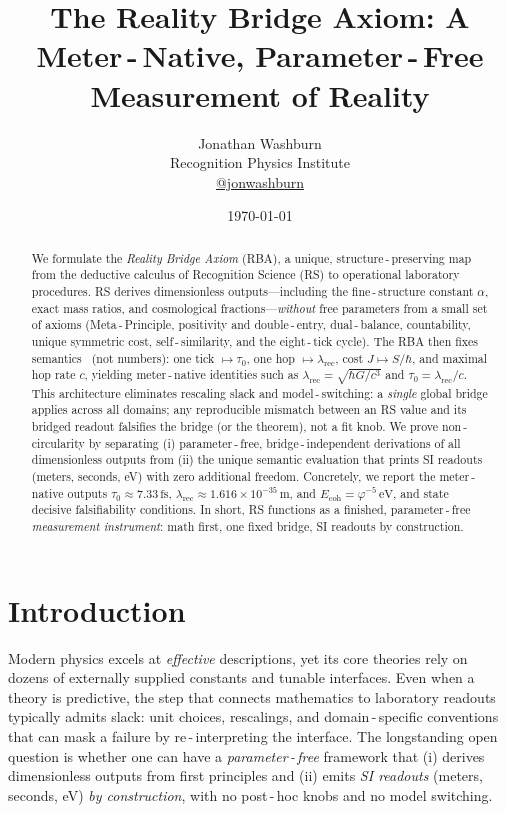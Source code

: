 \documentclass[11pt]{article}
\title{\textbf{The Reality Bridge Axiom: A Meter\,\mbox{-}\,Native, Parameter\,\mbox{-}\,Free Measurement of Reality}}
\author{Jonathan Washburn \\
\small Recognition Physics Institute \\
\small \href{https://twitter.com/jonwashburn}{@jonwashburn}}
\date{\today}
\newcommand{\ph}{\varphi}
\newcommand{\lamrec}{\lambda_{\mathrm{rec}}}
\newcommand{\tauzero}{\tau_{0}}
\newcommand{\Ecoh}{E_{\mathrm{coh}}}
\theoremstyle{remark}
\begin{document}
\maketitle

\begin{abstract}
\noindent
We formulate the \emph{Reality Bridge Axiom} (RBA), a unique, structure\,\mbox{-}\,preserving map from the deductive calculus of Recognition Science (RS) to
operational laboratory procedures. RS derives dimensionless outputs---including the fine\,\mbox{-}\,structure constant $\alpha$, exact mass ratios, and cosmological fractions---\emph{without} free parameters from a small set of axioms (Meta\,\mbox{-}\,Principle, positivity and double\,\mbox{-}\,entry, dual\,\mbox{-}\,balance, countability, unique symmetric cost, self\,\mbox{-}\,similarity, and the eight\,\mbox{-}\,tick cycle). The RBA then fixes semantics \
(not numbers): one tick $\mapsto \tauzero$, one hop $\mapsto \lamrec$, cost $J \mapsto S/\hbar$, and maximal hop rate $c$, yielding meter\,\mbox{-}\,native identities such as $\lamrec = \sqrt{\hbar G/c^{3}}$ and $\tauzero = \lamrec/c$. This architecture eliminates rescaling slack and model\,\mbox{-}\,switching: a \emph{single} global bridge applies across all domains; any reproducible mismatch between an RS value and its bridged readout falsifies the bridge (or the theorem), not a fit knob. We prove non\,\mbox{-}\,circularity by separating (i) parameter\,\mbox{-}\,free, bridge\,\mbox{-}\,independent derivations of all dimensionless outputs from (ii) the unique semantic evaluation that prints SI readouts (meters, seconds, eV) with zero additional freedom. Concretely, we report the meter\,\mbox{-}\,native outputs $\tauzero \approx 7.33\,\mathrm{fs}$, $\lamrec \approx 1.616\times 10^{-35}\,\mathrm{m}$, and $\Ecoh = \ph^{-5}\,\mathrm{eV}$, and state decisive falsifiability conditions. In short, RS functions as a finished, parameter\,\mbox{-}\,free \emph{measurement instrument}: math first, one fixed bridge, SI readouts by construction.
\end{abstract}

\section{Introduction}
Modern physics excels at \emph{effective} descriptions, yet its core theories rely on
dozens of externally supplied constants and tunable interfaces. Even when a theory
is predictive, the step that connects mathematics to laboratory readouts typically
admits slack: unit choices, rescalings, and domain\,\mbox{-}\,specific conventions that can
mask a failure by re\,\mbox{-}\,interpreting the interface. The longstanding open question is
whether one can have a \emph{parameter\,\mbox{-}\,free} framework that (i) derives dimensionless
outputs from first principles and (ii) emits \emph{SI readouts} (meters, seconds, eV)
\emph{by construction}, with no post\,\mbox{-}\,hoc knobs and no model switching.
\end{document}
